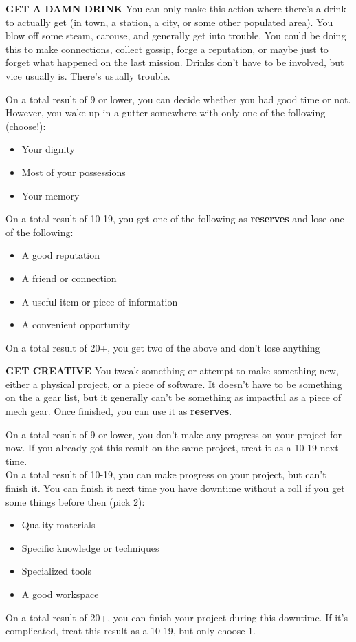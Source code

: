 \textbf{GET A DAMN DRINK}
You can only make this action where there’s a drink to actually get (in town, a station, a city, or some other populated area). You blow off some steam, carouse, and generally get into trouble. You could be doing this to make connections, collect gossip, forge a reputation, or maybe just to forget what happened on the last mission. Drinks don’t have to be involved, but vice usually is. There’s usually trouble.

On a total result of 9 or lower, you can decide whether you had good time or not. However, you wake up in a gutter somewhere with only one of the following (choose!):
\begin{itemize}
\item Your dignity
\item Most of your possessions
\item Your memory
\end{itemize}  
On a total result of 10-19, you get one of the following as \textbf{reserves} and lose one of the following:
\begin{itemize}
\item A good reputation
\item A friend or connection
\item A useful item or piece of information
\item A convenient opportunity
\end{itemize}  
On a total result of 20+, you get two of the above and don’t lose anything

\textbf{GET CREATIVE}
You tweak something or attempt to make something new, either a physical project, or a piece of software. It doesn’t have to be something on the a gear list, but it generally can’t be something as impactful as a piece of mech gear. Once finished, you can use it as \textbf{reserves}. 

On a total result of 9 or lower, you don’t make any progress on your project for now. If you already got this result on the same project, treat it as a 10-19 next time.\\
On a total result of 10-19, you can make progress on your project, but can’t finish it. You can finish it next time you have downtime without a roll if you get some things before then (pick 2):
\begin{itemize}
\item Quality materials
\item Specific knowledge or techniques
\item Specialized tools
\item A good workspace
\end{itemize}  
On a total result of 20+, you can finish your project during this downtime. If it’s complicated, treat this result as a 10-19, but only choose 1.

